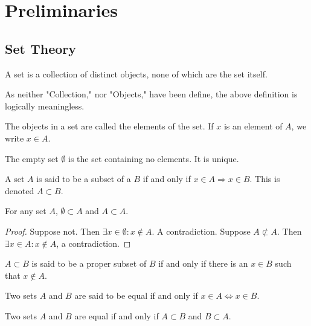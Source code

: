 \documentclass[crop=false,class=article,oneside]{standalone}
\begin{document}
    \ifx\ifsub\undefined
        \section*{Preliminaries}
        \setcounter{section}{1}
    \fi
    \subsection{Set Theory}
        \begin{definition}
        A set is a collection of distinct objects, none of which are the set itself.
        \end{definition}
        \begin{remark}
        As neither "Collection," nor "Objects," have been define, the above definition is logically meaningless.
        \end{remark}
        \begin{definition}
        The objects in a set are called the elements of the set. If $x$ is an element of $A$, we write $x\in A$.
        \end{definition}
        \begin{definition}
        The empty set $\emptyset$ is the set containing no elements. It is unique.
        \end{definition}
        \begin{definition}
        A set $A$ is said to be a subset of a $B$ if and only if $x\in A\Rightarrow x\in B$. This is denoted $A\subset B$.
        \end{definition}
        \begin{corollary}
        For any set $A$, $\emptyset \subset A$ and $A\subset A$.
        \end{corollary}
        \begin{proof}
        Suppose not. Then $\exists x\in \emptyset: x\notin A$. A contradiction. Suppose $A\not\subset A$. Then $\exists x\in A:x\notin A$, a contradiction.
        \end{proof}
        \begin{definition}
        $A\subset B$ is said to be a proper subset of $B$ if and only if there is an $x\in B$ such that $x\notin A$.
        \end{definition}
        \begin{definition}
        Two sets $A$ and $B$ are said to be equal if and only if $x\in A \Leftrightarrow x\in B$.
        \end{definition}
        \begin{theorem}
        Two sets $A$ and $B$ are equal if and only if $A\subset B$ and $B\subset A$.
        \end{theorem}
\end{document}
